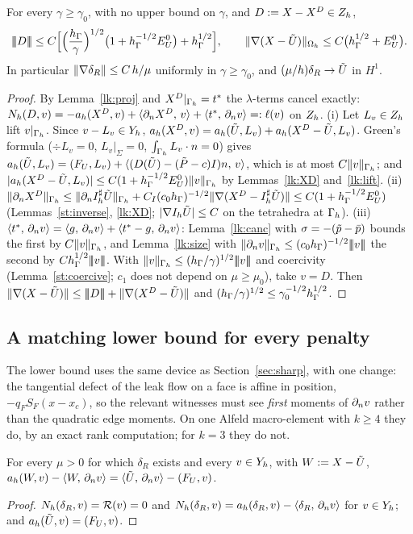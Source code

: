 \begin{theorem}\label{lk:up}
For every $\gamma\ge\gamma_0$, with no upper bound on $\gamma$, and $D:=X-X^D\in Z_h$,
\[
|\!|\!|D|\!|\!|\le C\Bigl[\Bigl(\frac{h_\Gamma}\gamma\Bigr)^{1/2}\bigl(1+h_\Gamma^{-1/2}E^0_U\bigr)+h_\Gamma^{1/2}\Bigr],\qquad\lVert \nabla(X-\tilde U)\rVert_{\Omega_h}\le C\bigl(h_\Gamma^{1/2}+E^0_U\bigr).
\]
In particular $\lVert \nabla\delta_R\rVert\le C\,h/\mu$ uniformly in $\gamma\ge\gamma_0$, and $(\mu/h)\delta_R\to\tilde U$ in $H^1$.
\end{theorem}
\begin{proof}
By Lemma~\ref{lk:proj} and $X^D|_{\Gamma_h}=t^\ast$ the $\lambda$-terms cancel exactly: $N_h(D,v)=-a_h(X^D,v)+\langle \partial_n X^D,\, v\rangle+\langle t^\ast,\, \partial_n v\rangle=:\ell(v)$ on $Z_h$.
(i) Let $L_v\in Z_h$ lift $v|_{\Gamma_h}$. Since $v-L_v\in Y_h$, $a_h(X^D,v)=a_h(\tilde U,L_v)+a_h(X^D-\tilde U,L_v)$. Green's formula ($\div L_v=0$, $L_v|_\Sigma=0$, $\int_{\Gamma_h}L_v\cdot n=0$) gives $a_h(\tilde U,L_v)=(F_U,L_v)+\langle (D(\tilde U)-(\tilde P-c)I)n,\, v\rangle$, which is at most $C\lVert v\rVert_{\Gamma_h}$; and $|a_h(X^D-\tilde U,L_v)|\le C(1+h_\Gamma^{-1/2}E^0_U)\lVert v\rVert_{\Gamma_h}$ by Lemmas~\ref{lk:XD} and~\ref{lk:lift}.
(ii) $\lVert \partial_n X^D\rVert_{\Gamma_h}\le\lVert \partial_n I^\sharp_h\tilde U\rVert_{\Gamma_h}+C_I(c_0h_\Gamma)^{-1/2}\lVert \nabla(X^D-I^\sharp_h\tilde U)\rVert\le C(1+h_\Gamma^{-1/2}E^0_U)$ (Lemmas~\ref{st:inverse}, \ref{lk:XD}; $|\nabla I_h\tilde U|\le C$ on the tetrahedra at $\Gamma_h$).
(iii) $\langle t^\ast,\, \partial_n v\rangle=\langle g,\, \partial_n v\rangle+\langle t^\ast-g,\, \partial_n v\rangle$: Lemma~\ref{lk:canc} with $\sigma=-(\tilde p-\bar p)$ bounds the first by $C\lVert v\rVert_{\Gamma_h}$, and Lemma~\ref{lk:size} with $\lVert \partial_n v\rVert_{\Gamma_h}\le(c_0h_\Gamma)^{-1/2}|\!|\!|v|\!|\!|$ the second by $Ch_\Gamma^{1/2}|\!|\!|v|\!|\!|$.
With $\lVert v\rVert_{\Gamma_h}\le(h_\Gamma/\gamma)^{1/2}|\!|\!|v|\!|\!|$ and coercivity (Lemma~\ref{st:coercive}; $c_1$ does not depend on $\mu\ge\mu_0$), take $v=D$. Then $\lVert \nabla(X-\tilde U)\rVert\le|\!|\!|D|\!|\!|+\lVert \nabla(X^D-\tilde U)\rVert$ and $(h_\Gamma/\gamma)^{1/2}\le\gamma_0^{-1/2}h_\Gamma^{1/2}$.
\end{proof}

\subsection{A matching lower bound for every penalty}
The lower bound uses the same device as Section~\ref{sec:sharp}, with one change: the tangential defect of the leak flow on a face is affine in position, $-q_FS_F(x-x_c)$, so the relevant witnesses must see \emph{first} moments of $\partial_n v$ rather than the quadratic edge moments. On one Alfeld macro-element with $k\ge4$ they do, by an exact rank computation; for $k=3$ they do not.
\begin{lemma}[Identity on $\Yh$]\label{lk:id}
For every $\mu>0$ for which $\delta_R$ exists and every $v\in Y_h$, with $W:=X-\tilde U$, $a_h(W,v)-\langle W,\, \partial_n v\rangle=\langle \tilde U,\, \partial_n v\rangle-(F_U,v)$.
\end{lemma}
\begin{proof}
$N_h(\delta_R,v)=\mathcal R(v)=0$ and $N_h(\delta_R,v)=a_h(\delta_R,v)-\langle \delta_R,\, \partial_n v\rangle$ for $v\in Y_h$; and $a_h(\tilde U,v)=(F_U,v)$.
\end{proof}

